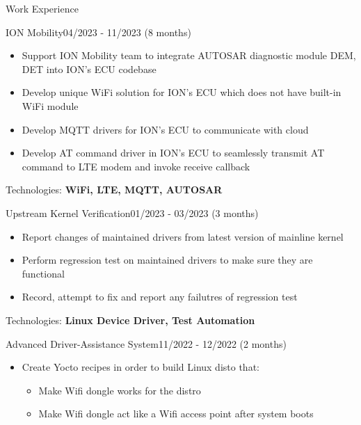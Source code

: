 \documentclass{resume} %
\begin{document}
\begin{rSection}{Work Experience}
\begin{rCompanySubsection}
        \begin{rProjectSubsubsection}{ION Mobility}{04/2023 - 11/2023 (8 months)}
            \begin{itemize}
                \item Support ION Mobility team to integrate AUTOSAR diagnostic module DEM, DET into ION's ECU codebase
                \item Develop unique WiFi solution for ION's ECU which does not have built-in WiFi module
                \item Develop MQTT drivers for ION's ECU to communicate with cloud
                \item Develop AT command driver in ION's ECU to seamlessly transmit AT command to LTE modem and invoke receive callback
            \end{itemize}
            \hspace*{2.5em}Technologies: \textbf{WiFi, LTE, MQTT, AUTOSAR}
        \end{rProjectSubsubsection}
        \begin{rProjectSubsubsection}{Upstream Kernel Verification}{01/2023 - 03/2023 (3 months)}
            \begin{itemize}
                \setlength{\itemindent}{1.25em}
                \item Report changes of maintained drivers from latest version of mainline kernel
                \item Perform regression test on maintained drivers to make sure they are functional
                \item Record, attempt to fix and report any failutres of regression test
            \end{itemize}
            \hspace*{2.5em}Technologies: \textbf{Linux Device Driver, Test Automation}
        \end{rProjectSubsubsection}
        \begin{rProjectSubsubsection}{Advanced Driver-Assistance System}{11/2022 - 12/2022 (2 months)}
            \begin{itemize}
                \setlength{\itemindent}{1.25em}
                \item Create Yocto recipes in order to build Linux disto that:
                \begin{itemize}
                    \item Make Wifi dongle works for the distro
                    \item Make Wifi dongle act like a Wifi access point after system boots

\end{itemize}
\end{itemize}
\end{rProjectSubsubsection}
\end{rCompanySubsection}
\end{rSection}
\end{document}
